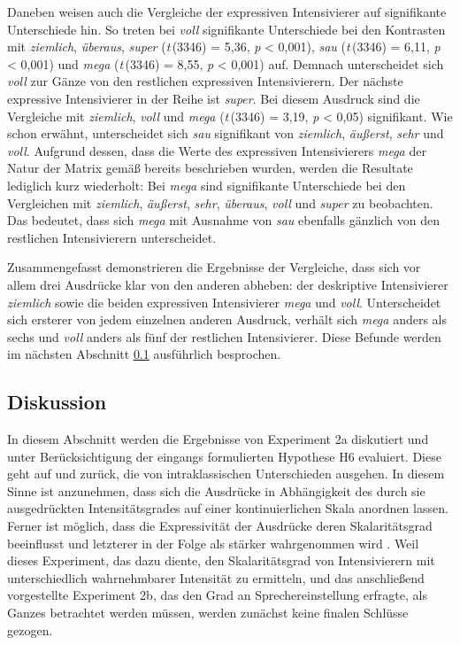 Daneben weisen auch die Vergleiche der expressiven Intensivierer auf signifikante Unterschiede hin. So treten bei \textit{voll} signifikante Unterschiede bei den Kontrasten mit \textit{ziemlich}, \textit{überaus}, \textit{super} (\textit{t}\,(3346) = 5,36, \textit{p} < 0,001), \textit{sau} (\textit{t}\,(3346) = 6,11, \textit{p} < 0,001) und \textit{mega} (\textit{t}\,(3346) = 8,55, \textit{p} < 0,001) auf. Demnach unterscheidet sich \textit{voll} zur Gänze von den restlichen expressiven Intensivierern. Der nächste expressive Intensivierer in der Reihe ist \textit{super}. Bei diesem Ausdruck sind die Vergleiche mit \textit{ziemlich}, \textit{voll} und \textit{mega} (\textit{t}\,(3346) = 3,19, {\textit{p} < 0,05)} signifikant. Wie schon erwähnt, unterscheidet sich \textit{sau} signifikant von \textit{ziemlich}, \textit{äußerst}, \textit{sehr} und \textit{voll}. Aufgrund dessen, dass die Werte des expressiven Intensivierers \textit{mega} der Natur der Matrix gemäß bereits beschrieben wurden, werden die Resultate lediglich kurz wiederholt: Bei \textit{mega} sind signifikante Unterschiede bei den Vergleichen mit \textit{ziemlich}, \textit{äußerst}, \textit{sehr}, \textit{überaus}, \textit{voll} und \textit{super} zu beobachten. Das bedeutet, dass sich \textit{mega} mit Ausnahme von \textit{sau} ebenfalls gänzlich von den restlichen Intensivierern unterscheidet.


Zusammengefasst demonstrieren die Ergebnisse der Vergleiche, dass sich vor allem drei Ausdrücke klar von den anderen abheben: der deskriptive Intensivierer \textit{ziemlich} sowie die beiden expressiven Intensivierer \textit{mega} und \textit{voll}. Unterscheidet sich ersterer von jedem einzelnen anderen Ausdruck, verhält sich \textit{mega} anders als sechs und \textit{voll} anders als fünf der restlichen Intensivierer. Diese Befunde werden im nächsten Abschnitt \ref{abs:Diskussion} ausführlich besprochen.





\subsection{Diskussion} \label{abs:Diskussion}
In diesem Abschnitt werden die Ergebnisse von Experiment 2a diskutiert und unter Berücksichtigung der eingangs formulierten {Hypothese H6} evaluiert. Diese geht auf \citet[87]{Biedermann.1969} und {\citet[408]{Breindl.2007}} zurück, die von intraklassischen Unterschieden ausgehen. In diesem Sinne ist anzunehmen, dass sich die Ausdrücke in Abhängigkeit des durch sie ausgedrückten Intensitätsgrades auf einer kontinuierlichen Skala anordnen lassen. Ferner ist möglich, dass die Expressivität der Ausdrücke deren Skalaritätsgrad beeinflusst und letzterer in der Folge als stärker wahrgenommen wird {\citep[vgl.][133]{Gutzmann.2019a}}. Weil dieses Experiment, das dazu diente, den Skalaritätsgrad von Intensivierern mit unterschiedlich wahrnehmbarer Intensität zu ermitteln, und das anschließend vorgestellte {Experiment 2b}, das den Grad an Sprechereinstellung erfragte, als Ganzes betrachtet werden müssen, werden zunächst keine finalen {Schlüsse gezogen}.


